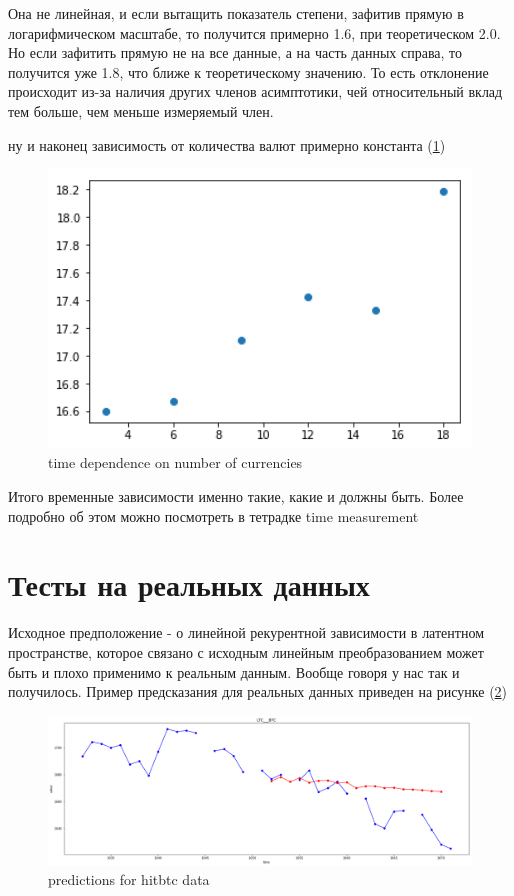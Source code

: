 \documentclass[11pt]{article}
\begin{document}
Она не линейная, и если вытащить показатель степени, зафитив прямую в логарифмическом масштабе, то получится примерно 1.6, при теоретическом 2.0. Но если зафитить прямую не на все данные, а на часть данных справа, то получится уже 1.8, что ближе к теоретическому значению. То есть отклонение происходит из-за наличия других членов асимптотики, чей относительный вклад тем больше, чем меньше измеряемый член. 

ну и наконец зависимость от количества валют примерно константа (\ref{fig:n_currencies_dependence})

\begin{figure}[!htb]
\includegraphics[width = 15cm]{n_currencies_dependence.png}
\caption{time dependence on number of currencies}
\label{fig:n_currencies_dependence}
\end{figure} 

Итого временные зависимости именно такие, какие и должны быть. Более подробно об этом можно посмотреть в тетрадке time measurement

\section{Тесты на реальных данных}
Исходное предположение - о линейной рекурентной зависимости в латентном пространстве, которое связано с исходным линейным преобразованием может быть и плохо применимо к реальным данным. Вообще говоря у нас так и получилось. Пример предсказания для реальных данных приведен на рисунке (\ref{fig:predictions_on_real})

\begin{figure}[!htb]
\includegraphics[width = 15cm]{predictions_on_real.png}
\caption{predictions for hitbtc data}
\label{fig:predictions_on_real}
\end{figure} 
\end{document}
